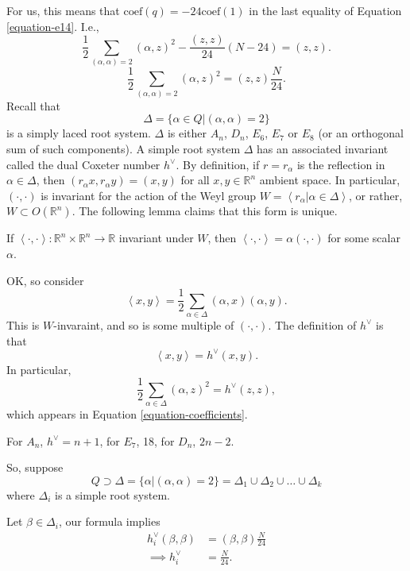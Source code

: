 For us, this means
that $\text{coef}(q)=-24\text{coef}(1)$ in
the last equality of
Equation \ref{equation-e14}.
I.e.,
\begin{equation}
\label{equation-coefficients}
\frac{1}{2}\sum_{(\alpha,\alpha)=2}(\alpha,z)
^2
-\frac{(z,z)}{24}(N-24)=(z,z).
\end{equation}
$$
\frac{1}{2}\sum_{(\alpha,\alpha)=2}(\alpha,z)
^2=(z,z)\frac{N}{24}.
$$
Recall that
$$
\Delta=\{\alpha\in Q|(\alpha,\alpha)=2\}
$$
is a simply laced root system.
$\Delta$ is either $A_n$, $D_n$, $E_6$, $E_7$
or $E_8$
(or an orthogonal sum of such components).
A simple root system $\Delta$ has
an associated invariant called the dual
Coxeter number
$h^\vee$. By definition, if $r=r_\alpha$ is
the reflection in $\alpha \in \Delta$,
then $(r_\alpha x,r_\alpha y)=(x,y)$ for all
$x,y \in \mathbb{R}^n$ ambient space.
In particular, $(\cdot,\cdot)$ is invariant
for the action of the Weyl group
$W=\left\langle{}r_\alpha|\alpha \in \Delta\right\rangle{}$,
or rather, $W \subset O(\mathbb{R}^n)$.
The following lemma claims that this form is
unique.

\begin{lemma}
\label{lemma-uniqueness-of-bilinear-form}
If
$\left\langle{}\cdot,\cdot\right\rangle{}:\mathbb{R}
^n\times\mathbb{R}^n\to\mathbb{R}$
invariant under $W$, then
$\left\langle{}\cdot,\cdot\right\rangle{}=\alpha(\cdot,\cdot)
$
for some scalar $\alpha$.
\end{lemma}

\noindent
OK, so consider
$$
\left\langle{}x,y\right\rangle{}=\frac{1}{2}
\sum_{\alpha \in \Delta}(\alpha,x)(\alpha,y).
$$
This is $W$-invaraint, and so is some
multiple of $(\cdot,\cdot)$.
The definition of $h^\vee$ is that
$$
\left\langle{}x,y\right\rangle{}=h^\vee(x,y).
$$
In particular,
$$
\frac{1}{2}\sum_{\alpha \in
\Delta}(\alpha,z)^2=h^\vee(z,z),
$$
which appears in Equation
\ref{equation-coefficients}.

\begin{example}
\label{example-coxeter-numbers}
For $A_n$, $h^\vee=n+1$, for $E_7$, 18,
for $D_n$, $2n-2$.
\end{example}

\noindent
So, suppose
$$
Q \supset \Delta=\{\alpha|(\alpha,\alpha)=2\}
=\Delta_1\cup \Delta_2\cup \ldots\cup
\Delta_k
$$
where $\Delta_i$ is a simple root system.

Let $\beta\in\Delta_i$, our formula implies
$$
\begin{aligned}
h_i^\vee(\beta,\beta)&=(\beta,\beta)\frac{N}
{24}\\
\implies h_i^\vee&=\frac{N}{24}.
\end{aligned}
$$


